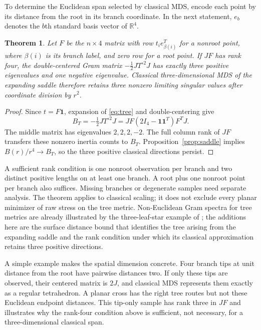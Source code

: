 \documentclass[11pt]{article}
\newtheorem{theorem}[proposition]{Theorem}
\newcommand{\R}{\mathbb R}
\newcommand{\one}{\mathbf 1}
\begin{document}
To determine the Euclidean span selected by classical MDS, encode each
point by its distance from the root in its branch coordinate. In the next
statement, $e_b$ denotes the $b$th standard basis vector of $\R^4$.
\begin{theorem}\label{thm:saddle}
Let $F$ be the $n\times4$ matrix with row $t_i e_{\beta(i)}^T$ for a nonroot point,
where $\beta(i)$ is its branch label, and zero row for a root point.
If $JF$ has rank four, the double-centered Gram matrix
$-\tfrac12JT^{\circ2}J$ has exactly three positive eigenvalues and one negative eigenvalue.
Classical three-dimensional MDS of the expanding saddle therefore retains
three nonzero limiting singular values after coordinate division by $r^2$.
\end{theorem}
\begin{proof}
Since $t=F\one$, expansion of \eqref{eq:tree} and double-centering give
\begin{equation}
 B_T=-\tfrac12JT^{\circ2}J
     =JF(2I_4-\one\one^T)F^TJ.\label{eq:tree-gram}
\end{equation}
The middle matrix has eigenvalues $2,2,2,-2$. The full column rank of $JF$
transfers these nonzero inertia counts to $B_T$. Proposition~\ref{prop:saddle}
implies $B(r)/r^4\to B_T$, so the three positive classical directions persist.
\end{proof}
A sufficient rank condition is one nonroot observation per branch and two
distinct positive lengths on at least one branch. A root plus one nonroot
point per branch also suffices. Missing branches or degenerate samples need
separate analysis. The theorem applies to classical scaling; it does not
exclude every planar minimizer of raw stress on the tree metric.
Non-Euclidean Gram spectra for tree metrics are already illustrated by the
three-leaf-star example of \citet[Example~2.6]{lim2024}; the additions here
are the surface distance bound that identifies the tree arising from the
expanding saddle and the rank condition under which its classical
approximation retains three positive directions.

A simple example makes the spatial dimension concrete. Four branch tips at
unit distance from the root have pairwise distances two. If only these tips
are observed, their centered matrix is $2J$, and classical MDS represents them
exactly as a regular tetrahedron. A planar cross has the right tree routes
but not these Euclidean endpoint distances. This tip-only sample has rank
three in $JF$ and illustrates why the rank-four condition above is sufficient,
not necessary, for a three-dimensional classical span.
\end{document}
